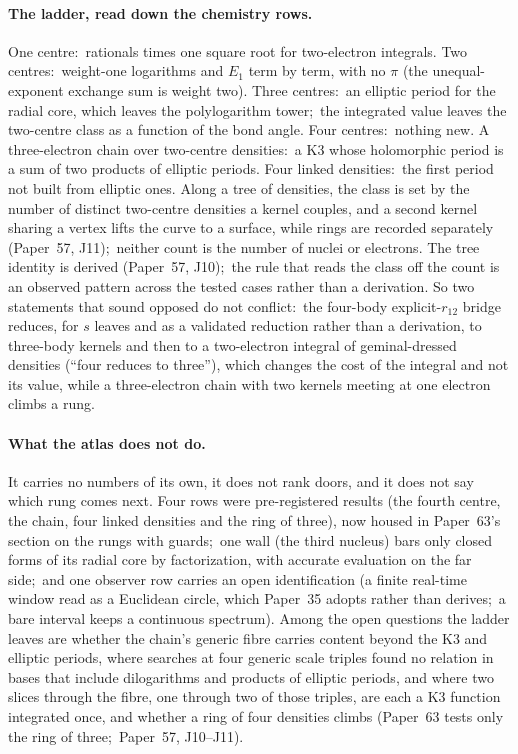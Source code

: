 \documentclass[11pt,a4paper]{article}
\newcommand{\gvc}[2]{#2}
\begin{document}
\paragraph{The ladder, read down the chemistry rows.}
One centre:\ rationals times one square root for two-electron integrals.  Two centres:\ weight-one
logarithms and $E_1$ term by term, with no $\pi$ (the unequal-exponent exchange sum is weight two).  Three centres:\ an elliptic
period for the radial core, which leaves the polylogarithm tower;\ the integrated
value leaves the two-centre class as a function of the bond angle.  Four centres:\
nothing new.  A three-electron chain over two-centre densities:\ a K3
whose holomorphic period is a sum of two products of elliptic periods.
Four linked densities:\ the first period not built from elliptic ones.
Along a tree of densities, the class is set by the number of distinct two-centre densities a kernel
couples, and a second kernel sharing a vertex lifts the curve to a
surface, while rings are recorded separately (Paper~57, J11);\ neither count is the number of nuclei or electrons.
The tree identity is derived (Paper~57, J10);\ the rule that reads the
class off the count is an observed pattern across the tested cases rather
than a derivation.  So two statements that sound opposed do not conflict:\ the
four-body explicit-$r_{12}$ bridge reduces, for $s$ leaves and as a
validated reduction rather than a derivation, to three-body kernels and
then to a two-electron integral of geminal-dressed densities (``four
reduces to three''), which changes the cost of the integral and not its value, while a three-electron chain with two kernels
meeting at one electron climbs a rung.

\paragraph{What the atlas does not do.}
It carries no numbers of its own, it does not rank doors, and it does
not say which rung comes next.  Four rows were pre-registered results
(the fourth centre, the chain, four linked densities and the ring of
three), now housed in Paper~63's section on the rungs with guards;\ one wall (the third
nucleus) bars only closed forms of its radial core by factorization,
with accurate evaluation on the far side;\ and \gvc{p35-window-circle-adopted}{one observer row carries an open
identification (a finite real-time window read as a Euclidean circle,
which Paper~35 adopts rather than derives;\ a bare interval keeps a
continuous spectrum)}.  Among the open questions the ladder leaves are whether
the chain's generic fibre carries content beyond the K3 and elliptic
periods, where searches at four generic scale triples found no relation
in bases that include dilogarithms and products of elliptic periods, and
where two slices through the fibre, one through two of those triples, are
each a K3 function integrated once, and whether
a ring of four densities climbs (Paper~63 tests only the ring of
three;\ Paper~57, J10--J11).
\end{document}
